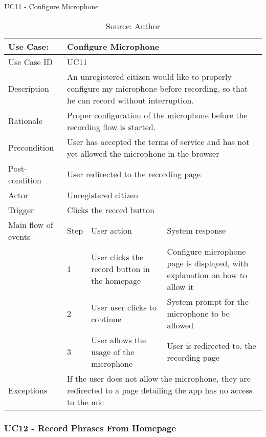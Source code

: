 \begin{table}[h]
\centering
\caption{UC11 - Configure Microphone}
\label{uc:11}
\begin{tabular}{|p{3cm}|p{1cm}|p{5cm}|p{5cm}|}
\hline
Use Case:       & \multicolumn{3}{p{11cm}|}{Configure Microphone} \\ \hline
Use Case ID     & \multicolumn{3}{p{11cm}|}{UC11} \\ \hline
Description     & \multicolumn{3}{p{11cm}|}{An unregistered citizen would like to properly configure my microphone before recording, so that he can record without interruption.} \\ \hline
Rationale       & \multicolumn{3}{p{11cm}|}{Proper configuration of the microphone before the recording flow is started.} \\ \hline
Precondition    & \multicolumn{3}{p{11cm}|}{User has accepted the terms of service and has not yet allowed the microphone in the browser} \\ \hline
Post-condition  & \multicolumn{3}{p{11cm}|}{User redirected to the recording page} \\ \hline
Actor           & \multicolumn{3}{p{11cm}|}{Unregistered citizen} \\ \hline
Trigger         & \multicolumn{3}{p{11cm}|}{Clicks the record button} \\ \hline
Main flow of events & Step  & User action & System response \\ \hline
                    & 1     & User clicks the record button in the homepage & Configure microphone page is displayed, with explanation on how to allow it \\ \hline
                    & 2     & User user clicks to continue & System prompt for the microphone to be allowed \\ \hline
                    & 3     & User allows the usage of the microphone & User is redirected to. the recording page \\ \hline
Exceptions      & \multicolumn{3}{p{11cm}|}{If the user does not allow the microphone, they are redirected to a page detailing the app has no access to the mic} \\ \hline
\end{tabular}
\caption*{Source: Author}
\end{table}

\subsubsection{UC12 - Record Phrases From Homepage}

